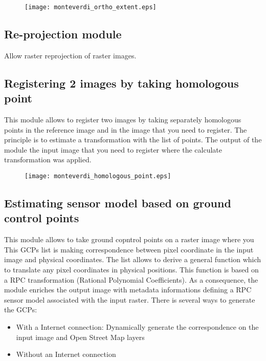\documentclass{InsightSoftwareGuide}
\begin{document}
\begin{figure}
   \center
   \texttt{[image: monteverdi\_ortho\_extent.eps]}
   \label{fig:concatenate}
\end{figure}

\subsection{Re-projection module}
Allow raster reprojection of raster images.
\subsection{Registering 2 images by taking homologous point}
This module allows to register two images by taking separately homologous points in the reference image and in the image 
that you need to register. The principle is to estimate a transformation with the list of points.
The output of the module the input image that you need to register where the calculate transformation was applied. 

\begin{figure}
   \center
   \texttt{[image: monteverdi\_homologous\_point.eps]}
   \label{fig:concatenate}
\end{figure}


\subsection{Estimating sensor model based on ground control points}
This module allows to take ground copntrol points on a raster image where you 
This GCPs list is making correspondence between pixel coordinate in the input image and physical coordinates. The list
allows to derive a general function which to translate any pixel coordinates in physical positions. This function is 
based on a RPC transformation (Rational Polynomial Coefficients). As a consequence, the module enriches the output image 
with metadata informations defining a RPC sensor model associated with the input raster. 
There is several ways to generate the GCPs:

\begin{itemize}
\item With a Internet connection: Dynamically generate the correspondence on the input image and Open Street Map layers
\item Without an  Internet connection
\end{itemize}
\end{document}
